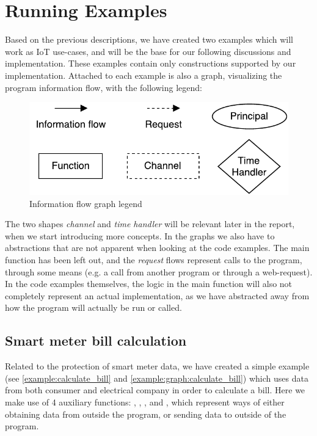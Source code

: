 
\section{Running Examples}
Based on the previous descriptions, we have created two examples which will work as IoT use-cases, and will be the base for our following discussions and implementation.
These examples contain only constructions supported by our implementation.
Attached to each example is also a graph, visualizing the program information flow, with the following legend:
\begin{figure}[H]
  \centering
  \includegraphics[scale=0.8]{figures/dlm_legend}
  \caption{Information flow graph legend}
  \label{example:legend}
\end{figure}
The two shapes \emph{channel} and \emph{time handler} will be relevant later in the report, when we start introducing more concepts.
In the graphs we also have to abstractions that are not apparent when looking at the code examples.
The main function has been left out, and the \emph{request} flows represent calls to the program, through some means (e.g. a call from another program or through a web-request).
In the code examples themselves, the logic in the main function will also not completely represent an actual implementation, as we have abstracted away from how the program will actually be run or called.

\subsection{Smart meter bill calculation}
Related to the protection of smart meter data, we have created a simple example (see \cref{example:calculate_bill} and \cref{example:graph:calculate_bill}) which uses data from both consumer and electrical company in order to calculate a bill.
Here we make use of 4 auxiliary functions: , , , and , which represent ways of either obtaining data from outside the program, or sending data to outside of the program.

